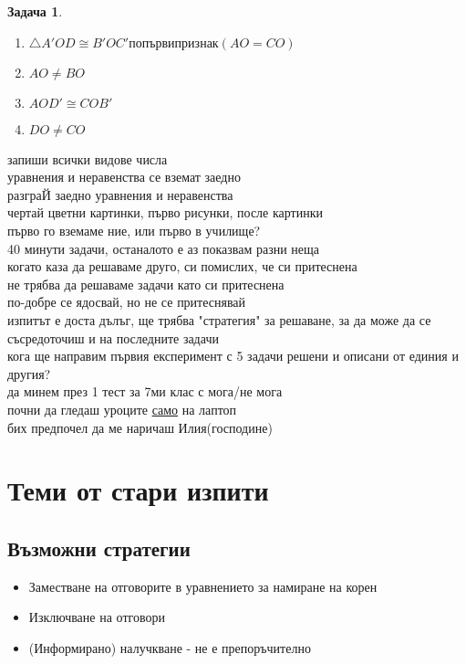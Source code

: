 \documentclass{article}
\newtheorem{problem}{Задача}
\begin{document}
\begin{problem}
	\begin{enumerate}
		\item 	$\triangle A'OD \cong B'OC' по първи признак(AO =CO ) $
		\item $AO \neq BO$ 
		\item $AOD' \cong COB'$
		\item $DO \neq CO$
	\end{enumerate}
	
\end{problem}
запиши всички видове числа \\
уравнения и неравенства се вземат заедно \\
разграЙ заедно уравнения и неравенства \\
чертай цветни картинки, първо рисунки, после картинки\\
първо го вземаме ние, или първо в училище?\\
40 минути задачи, останалото е аз показвам разни неща\\
когато каза да решаваме друго, си помислих, че си притеснена\\
не трябва да решаваме задачи като си притеснена\\
по-добре се ядосвай, но не се притеснявай\\
изпитът е доста дълъг, ще трябва "стратегия" за решаване, за да може да се съсредоточиш и на последните задачи \\
кога ще направим първия експеримент с 5 задачи решени и описани от единия и другия?\\
да минем през 1 тест за 7ми клас с мога/не мога \\
почни да гледаш уроците \underline{само} на лаптоп\\
бих предпочел да ме наричаш Илия(господине)\\



\section{Теми от стари изпити}
\subsection{Възможни стратегии}
\begin{itemize}
	\item Заместване на отговорите в уравнението за намиране на корен
	\item Изключване на отговори
	\item (Информирано) налучкване - не е препоръчително
\end{itemize}
\end{document}
